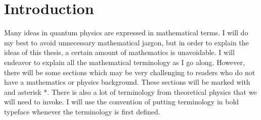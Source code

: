\chapter{Introduction}
Many ideas in quantum physics are expressed in mathematical terms. I will do my best to avoid unnecessary mathematical jargon, but in order to explain the ideas of this thesis, a certain amount of mathematics is unavoidable. I will endeavor to explain all the mathematical terminology as I go along. However, there will be some sections which may be very challenging to readers who do not have a mathematics or physics background. These sections will be marked with and asterisk *.\label{asteriskmeaning} There is also a lot of terminology from theoretical physics that we will need to invoke. I will use the convention of putting terminology in bold typeface whenever the terminology is first defined.